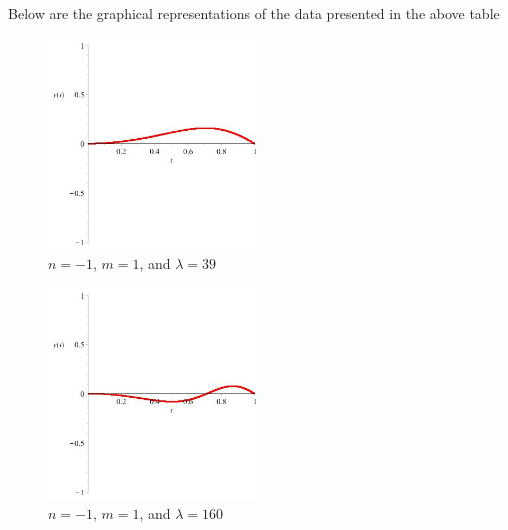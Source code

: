 \documentclass[executivepaper]{article}
\begin{document}
\vspace{5mm}

Below are the graphical representations of the data presented in the above table

\begin{figure}[H]

\centering

\includegraphics[width=0.5\textwidth]{NEqualsNegative1MEquals1LambdaEquals39}

\caption{$n=-1$, $m=1$, and $\lambda=39$}

\end{figure}

\begin{figure}[H]

\centering

\includegraphics[width=0.5\textwidth]{NEqualsNegative1MEquals1LambdaEquals160}

\caption{$n=-1$, $m=1$, and $\lambda=160$}

\end{figure}
\end{document}
